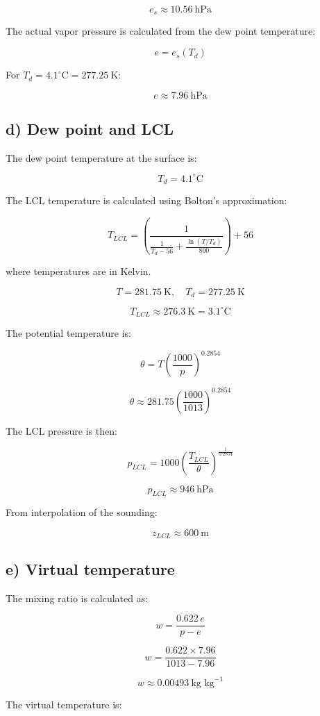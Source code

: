 \documentclass{article}
\begin{document}
\[
e_s \approx 10.56 \ \text{hPa}
\]

The actual vapor pressure is calculated from the dew point temperature:

\[
e = e_s(T_d)
\]

For $T_d = 4.1^\circ\text{C} = 277.25 \ \text{K}$:

\[
e \approx 7.96 \ \text{hPa}
\]


\subsection*{d) Dew point and LCL}

The dew point temperature at the surface is:

\[
T_d = 4.1^\circ\text{C}
\]

The LCL temperature is calculated using Bolton's approximation:

\[
T_{LCL} = \left( \frac{1}{\frac{1}{T_d - 56} + \frac{\ln(T/T_d)}{800}} \right) + 56
\]

where temperatures are in Kelvin.

\[
T = 281.75 \ \text{K}, \quad T_d = 277.25 \ \text{K}
\]

\[
T_{LCL} \approx 276.3 \ \text{K} = 3.1^\circ\text{C}
\]

The potential temperature is:

\[
\theta = T \left( \frac{1000}{p} \right)^{0.2854}
\]

\[
\theta \approx 281.75 \left( \frac{1000}{1013} \right)^{0.2854}
\]

The LCL pressure is then:

\[
p_{LCL} = 1000 \left( \frac{T_{LCL}}{\theta} \right)^{\frac{1}{0.2854}}
\]

\[
p_{LCL} \approx 946 \ \text{hPa}
\]

From interpolation of the sounding:

\[
z_{LCL} \approx 600 \ \text{m}
\]

\subsection*{e) Virtual temperature}

The mixing ratio is calculated as:

\[
w = \frac{0.622 \, e}{p - e}
\]

\[
w = \frac{0.622 \times 7.96}{1013 - 7.96}
\]

\[
w \approx 0.00493 \ \text{kg kg}^{-1}
\]

The virtual temperature is:
\end{document}
